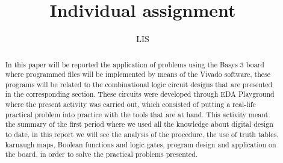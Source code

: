 \documentclass{article}
\begin{document}
\renewcommand{\footrulewidth}{1pt}
\renewcommand{\tablename}{Tabla}
\author{}%
\title{Individual assignment}
\date{LIS}%
\maketitle
\begin{abstract}
In this paper will be reported the application of problems using the Basys 3 board where programmed files will be implemented by means of the Vivado software, these programs will be related to the combinational logic circuit designs that are presented in the corresponding section. These circuits were developed through EDA Playground where the present activity was carried out, which consisted of putting a real-life practical problem into practice with the tools that are at hand. This activity meant the summary of the first period where we used all the knowledge about digital design to date, in this report we will see the analysis of the procedure, the use of truth tables, karnaugh maps, Boolean functions and logic gates, program design and application on the board, in order to solve the practical problems presented.


\end{abstract}
\end{document}
